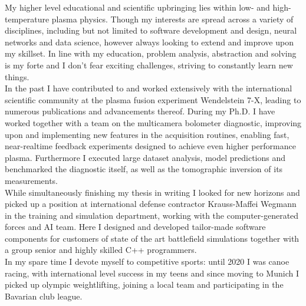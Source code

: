 \documentclass[11pt,a4paper]{moderncv}
\begin{document}
%
My higher level educational and scientific upbringing lies within low- and high-temperature plasma physics. Though my interests are spread across a variety of disciplines, including but not limited to software development and design, neural networks and data science, however always looking to extend and improve upon my skillset. In line with my education, problem analysis, abstraction and solving is my forte and I don't fear exciting challenges, striving to constantly learn new things.\\[0.25cm]%
%
In the past I have contributed to and worked extensively with the international scientific community at the plasma fusion experiment Wendelstein 7-X, leading to numerous publications and advancements thereof.  During my Ph.D. I have worked together with a team on the multicamera bolometer diagnostic, improving upon and implementing new features in the acquisition routines, enabling fast, near-realtime feedback experiments designed to achieve even higher performance plasma. Furthermore I executed large dataset analysis, model predictions and benchmarked the diagnostic itself, as well as the tomographic inversion of its measurements.\\[0.25cm]%
%
While simultaneously finishing my thesis in writing I looked for new horizons and picked up a position at international defense contractor Krauss-Maffei Wegmann in the training and simulation department, working with the computer-generated forces and AI team. Here I designed and developed tailor-made software components for customers of state of the art battlefield simulations together with a group senior and highly skilled C++ programmers.\\[0.25cm]%
%
In my spare time I devote myself to competitive sports: until 2020 I was canoe racing, with international level success in my teens and since moving to Munich I picked up olympic weightlifting, joining a local team and participating in the Bavarian club league.\\[0.25cm]%
\end{document}
